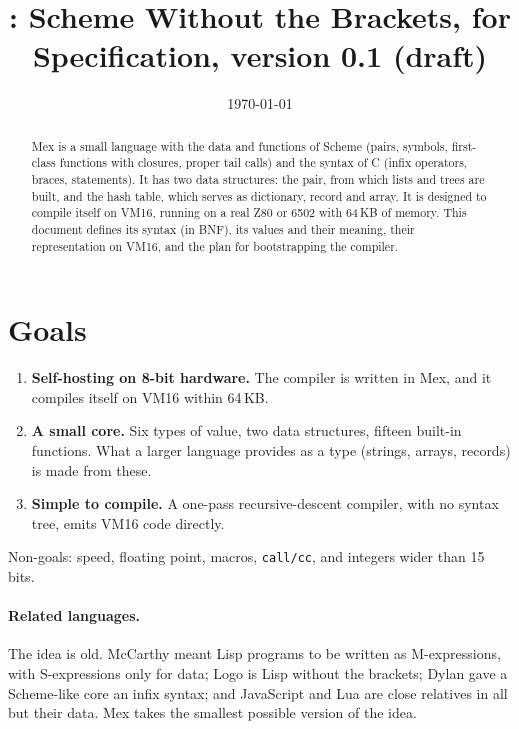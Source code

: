 \documentclass[11pt,a4paper]{article}
\title{\lang: Scheme Without the Brackets, for \vm{}\\[4pt]
\large Specification, version 0.1 (draft)}
\author{}
\date{\today}
\newcommand{\lang}{Mex}
\newcommand{\vm}{VM16}
\begin{document}
\maketitle

\begin{abstract}
\noindent
\lang{} is a small language with the data and functions of Scheme (pairs,
symbols, first-class functions with closures, proper tail calls) and the
syntax of C (infix operators, braces, statements). It has two data
structures: the pair, from which lists and trees are built, and the hash
table, which serves as dictionary, record and array. It is designed to compile itself on \vm{},
running on a real Z80 or 6502 with 64\,KB of memory. This document defines
its syntax (in BNF), its values and their meaning, their representation on
\vm{}, and the plan for bootstrapping the compiler.
\end{abstract}

\section{Goals}

\begin{enumerate}[nosep]
\item \textbf{Self-hosting on 8-bit hardware.} The compiler is written in
  \lang{}, and it compiles itself on \vm{} within 64\,KB.
\item \textbf{A small core.} Six types of value, two data structures,
  fifteen built-in functions. What a larger language provides as a type
  (strings, arrays, records) is made from these.
\item \textbf{Simple to compile.} A one-pass recursive-descent compiler,
  with no syntax tree, emits \vm{} code directly.
\end{enumerate}
Non-goals: speed, floating point, macros, \texttt{call/cc}, and
integers wider than 15 bits.

\paragraph{Related languages.} The idea is old. McCarthy meant Lisp
programs to be written as M-expressions, with S-expressions only for data;
Logo is Lisp without the brackets; Dylan gave a Scheme-like core an infix
syntax; and JavaScript and Lua are close relatives in all but their data.
\lang{} takes the smallest possible version of the idea.
\end{document}
